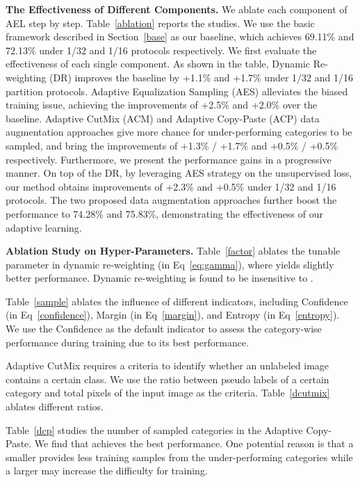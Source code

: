 \textbf{The Effectiveness of Different Components.} 
We ablate each component of AEL step by step. Table~\ref{ablation} reports the studies. We use the basic framework described in Section~\ref{base} as our baseline, which achieves 69.11\% and 72.13\% under 1/32 and 1/16 protocols respectively. We first evaluate the effectiveness of each single component. As shown in the table, Dynamic Re-weighting (DR) improves the baseline by +1.1\% and +1.7\% under 1/32 and 1/16 partition protocols. Adaptive Equalization Sampling (AES) alleviates the biased training issue, achieving the improvements of +2.5\% and +2.0\% over the baseline. Adaptive CutMix (ACM) and Adaptive Copy-Paste (ACP) data augmentation approaches give more chance for under-performing categories to be sampled, and bring the improvements of +1.3\% / +1.7\% and +0.5\% / +0.5\% respectively.
Furthermore, we present the performance gains in a progressive manner. On top of the DR, by leveraging AES strategy on the unsupervised loss, our method obtains improvements of +2.3\% and +0.5\% under 1/32 and 1/16 protocols. The two proposed data augmentation approaches further boost the performance to 74.28\% and 75.83\%, demonstrating the effectiveness of our adaptive learning.


\textbf{Ablation Study on Hyper-Parameters.} Table~\ref{factor} ablates the tunable parameter  in dynamic re-weighting (in Eq~\ref{eq:gamma}), where  yields slightly better performance. Dynamic re-weighting is found to be insensitive to . 

\noindent Table~\ref{sample} ablates the influence of different indicators, including Confidence (in Eq~\ref{confidence}), Margin (in Eq~\ref{margin}), and Entropy (in Eq~\ref{entropy}). We use the Confidence as the default indicator to assess the category-wise performance during training due to its best performance. 


\noindent Adaptive CutMix requires a criteria to identify whether an unlabeled image contains a certain class. We use the ratio between pseudo labels of a certain category and total pixels of the input image as the criteria. Table~\ref{dcutmix} ablates different ratios.



\noindent Table~\ref{dcp} studies the number of sampled categories  in the Adaptive Copy-Paste. We find that  achieves the best performance. One potential reason is that a smaller  provides less training samples from the under-performing categories while a larger  may increase the difficulty for training.



